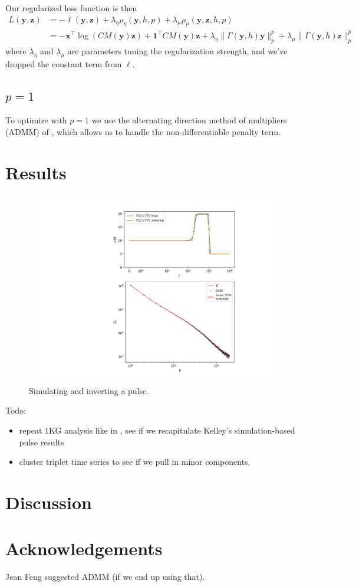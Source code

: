 \documentclass[11pt]{article}
\begin{document}
Our regularized loss function is then
\begin{align}
L(\boldsymbol y, \boldsymbol z) &= - \ell(\boldsymbol y, \boldsymbol z) + \lambda_\eta \rho_\eta(\boldsymbol y, h, p) + \lambda_\mu \rho_\mu(\boldsymbol y, \boldsymbol z, h, p)\\
&= -\boldsymbol x^\intercal\log(C M(\boldsymbol y) \boldsymbol z) + \boldsymbol 1^\intercal C M(\boldsymbol y) \boldsymbol z + \lambda_\eta \|\Gamma(\boldsymbol y, h) \boldsymbol y\|_p^p + \lambda_\mu \|\Gamma(\boldsymbol y, h) \boldsymbol z\|_p^p
\end{align}
where $\lambda_\eta$ and $\lambda_\mu$ are parameters tuning the regularization strength, and we've dropped the constant term from $\ell$.


\subsection{$p=1$}

To optimize with $p=1$ we use the alternating direction method of multipliers (ADMM) of \cite{Boyd2011-dm}, which allows us to handle the non-differentiable penalty term.



\section{Results}\label{sec:results}

\begin{figure}
  \centering
  \includegraphics[width=.7\textwidth]{figures/fit_teaser}
  \caption{Simulating and inverting a pulse.}
  \label{}
\end{figure}

Todo:
\begin{itemize}
\item repeat 1KG analysis like in \cite{Harris2017-fw}, see if we recapitulate Kelley's simulation-based pulse results
\item cluster triplet time series to see if we pull in minor components.
\end{itemize}


\section{Discussion}\label{sec:discussion}

\section{Acknowledgements}\label{sec:ack}
Jean Feng suggested ADMM (if we end up using that).



\end{document}

